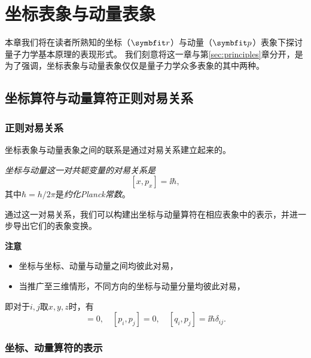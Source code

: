 
\section{坐标表象与动量表象}
\label{sec:coord_moment_rep}

本章我们将在读者所熟知的坐标（$\rr$）与动量（$\pp$）表象下探讨量子力学基本原理的表现形式。
我们刻意将这一章与第\ref{sec:principles}章分开，是为了强调，坐标表象与动量表象仅仅是量子力学众多表象的其中两种。

\subsection{\texorpdfstring{坐标算符与动量算符\quad 正则对易关系}{坐标算符与动量算符  正则对易关系}}
\label{subsec:cmr_operators}

\subsubsection{正则对易关系}

坐标表象与动量表象之间的联系是通过对易关系建立起来的。
\begin{tcolorbox}
\emph{坐标与动量这一对共轭变量的对易关系是}
\begin{equation}
    \label{eq:cmr_commutator}
    [x, p_x] = \ii\hbar,
\end{equation}
其中$\hbar=h/2\pi$是\emph{约化Planck常数}。
\end{tcolorbox}
通过这一对易关系，我们可以构建出坐标与动量算符在相应表象中的表示，并进一步导出它们的表象变换。

\begin{tcolorbox}
\textbf{注意}
\begin{itemize}
    \item{坐标与坐标、动量与动量之间均彼此对易，}
    \item{当推广至三维情形，不同方向的坐标与动量分量均彼此对易，}
\end{itemize}
即对于$i,j$取$x,y,z$时，有
\begin{equation}
    [q_i, q_j]=0,\quad [p_i, p_j]=0,\quad [q_i,p_j]=\ii\hbar\delta_{ij}.
\end{equation}
\end{tcolorbox}


\subsubsection{坐标、动量算符的表示}

